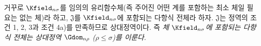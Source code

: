 
거꾸로 $\Kfield_{n\sigma}$를 임의의 유리함수체(즉 주어진 어떤 계를 포함하는 최소 체일 필요는 없는 체)라 하고, $\mathfrak J$를 $\Kfield_{n\sigma}$에 포함되는 다항식 전체라 하자. $\mathfrak J$는 정역의 조건 1, 2, 3과 조건 4a)를 만족하므로 상대정역이다. 즉 \emph{체 $\Kfield_{n\sigma}$에 포함되는 다항식 전체는 상대정역 $\Gdom_{n\rho}$ ($\rho\le\sigma$)를 이룬다.}

